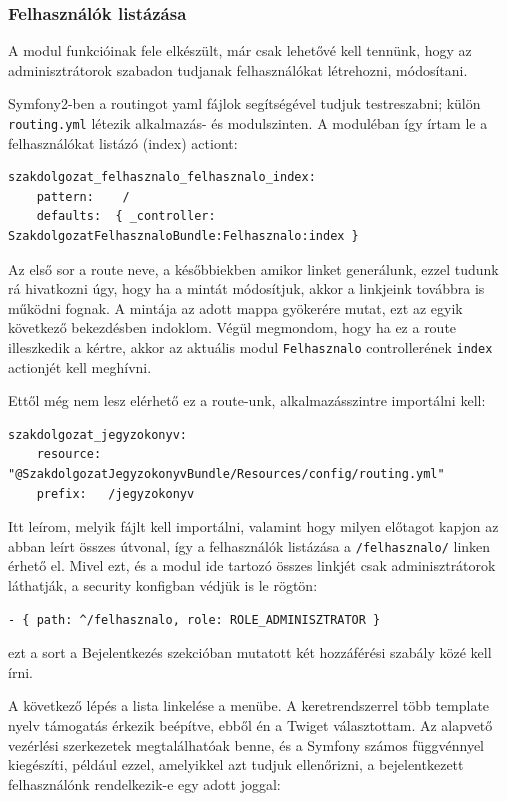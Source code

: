 \documentclass[a4paper,12pt,oneside]{report}
\begin{document}
\subsubsection*{Felhasználók listázása}

A modul funkcióinak fele elkészült, már csak lehetővé kell tennünk, hogy az adminisztrátorok szabadon tudjanak felhasználókat létrehozni, módosítani.

Symfony2-ben a routingot yaml fájlok segítségével tudjuk testreszabni; külön {\tt routing.yml} létezik alkalmazás- és modulszinten. A moduléban így írtam le a felhasználókat listázó (index) actiont:

\begin{lstlisting}
szakdolgozat_felhasznalo_felhasznalo_index:
    pattern:    /
    defaults:  { _controller: SzakdolgozatFelhasznaloBundle:Felhasznalo:index }
\end{lstlisting}

Az első sor a route neve, a későbbiekben amikor linket generálunk, ezzel tudunk rá hivatkozni úgy, hogy ha a mintát módosítjuk, akkor a linkjeink továbbra is működni fognak. A mintája az adott mappa gyökerére mutat, ezt az egyik következő bekezdésben indoklom. Végül megmondom, hogy ha ez a route illeszkedik a kértre, akkor az aktuális modul {\tt Felhasznalo} controllerének {\tt index} actionjét kell meghívni.

Ettől még nem lesz elérhető ez a route-unk, alkalmazásszintre importálni kell:

\begin{lstlisting}
szakdolgozat_jegyzokonyv:
    resource: "@SzakdolgozatJegyzokonyvBundle/Resources/config/routing.yml"
    prefix:   /jegyzokonyv
\end{lstlisting}

Itt leírom, melyik fájlt kell importálni, valamint hogy milyen előtagot kapjon az abban leírt összes útvonal, így a felhasználók listázása a {\tt /felhasznalo/} linken érhető el. Mivel ezt, és a modul ide tartozó összes linkjét csak adminisztrátorok láthatják, a security konfigban védjük is le rögtön:

\begin{lstlisting}
- { path: ^/felhasznalo, role: ROLE_ADMINISZTRATOR }
\end{lstlisting}

ezt a sort a Bejelentkezés szekcióban mutatott két hozzáférési szabály közé kell írni.

A következő lépés a lista linkelése a menübe. A keretrendszerrel több template nyelv támogatás érkezik beépítve, ebből én a Twiget\cite{website:twig} választottam. Az alapvető vezérlési szerkezetek megtalálhatóak benne, és a Symfony számos függvénnyel kiegészíti, például ezzel, amelyikkel azt tudjuk ellenőrizni, a bejelentkezett felhasználónk rendelkezik-e egy adott joggal:
\end{document}
